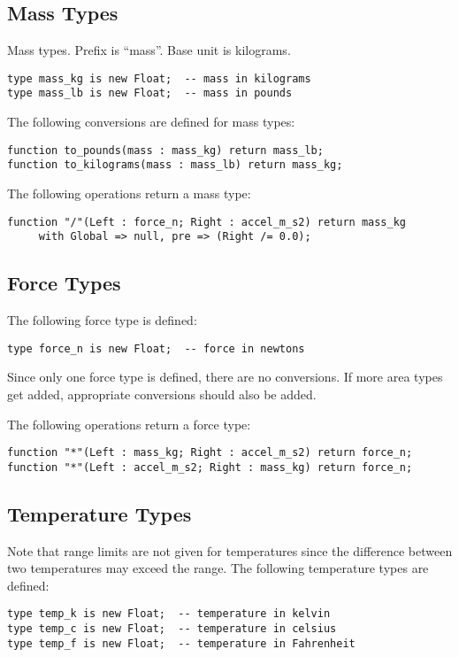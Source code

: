 \documentclass[10pt, openany]{book}
\begin{document}
\subsection{Mass Types}
Mass types.  Prefix is ``mass''.  Base unit is kilograms.
\begin{lstlisting}
type mass_kg is new Float;  -- mass in kilograms
type mass_lb is new Float;  -- mass in pounds
\end{lstlisting}

The following conversions are defined for mass types:
\begin{lstlisting}
function to_pounds(mass : mass_kg) return mass_lb;
function to_kilograms(mass : mass_lb) return mass_kg;
\end{lstlisting}

The following operations return a mass type:
\begin{lstlisting}
function "/"(Left : force_n; Right : accel_m_s2) return mass_kg
     with Global => null, pre => (Right /= 0.0);
\end{lstlisting}

\subsection{Force Types}
The following force type is defined:
\begin{lstlisting}
type force_n is new Float;  -- force in newtons
\end{lstlisting}

Since only one force type is defined, there are no conversions.  If more area types get added, appropriate conversions should also be added.

The following operations return a force type:
\begin{lstlisting}
function "*"(Left : mass_kg; Right : accel_m_s2) return force_n;
function "*"(Left : accel_m_s2; Right : mass_kg) return force_n;
\end{lstlisting}

\subsection{Temperature Types}
Note that range limits are not given for temperatures since the difference between two temperatures may exceed the range.  The following temperature types are defined:
\begin{lstlisting}
type temp_k is new Float;  -- temperature in kelvin
type temp_c is new Float;  -- temperature in celsius
type temp_f is new Float;  -- temperature in Fahrenheit
\end{lstlisting}
\end{document}
